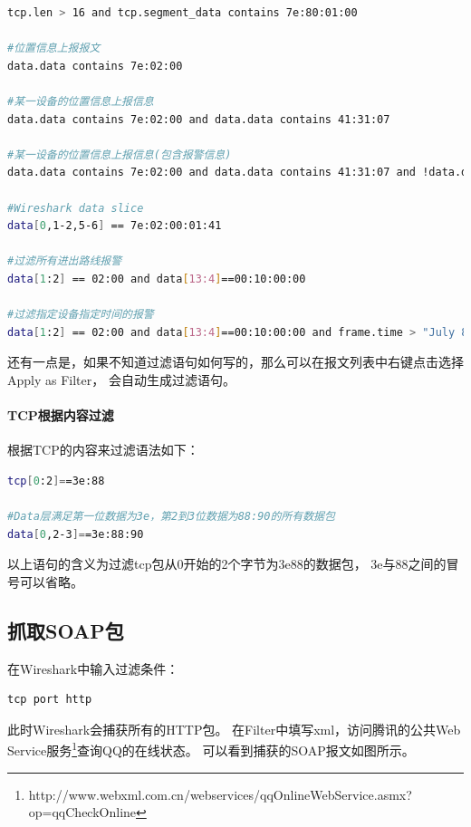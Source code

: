 \documentclass{book}
\begin{document}
\begin{lstlisting}[language=Bash]
tcp.len > 16 and tcp.segment_data contains 7e:80:01:00

#位置信息上报报文
data.data contains 7e:02:00

#某一设备的位置信息上报信息
data.data contains 7e:02:00 and data.data contains 41:31:07

#某一设备的位置信息上报信息(包含报警信息)
data.data contains 7e:02:00 and data.data contains 41:31:07 and !data.data[53,4] == 00:00:00:00

#Wireshark data slice
data[0,1-2,5-6] == 7e:02:00:01:41

#过滤所有进出路线报警
data[1:2] == 02:00 and data[13:4]==00:10:00:00

#过滤指定设备指定时间的报警
data[1:2] == 02:00 and data[13:4]==00:10:00:00 and frame.time > "July 8, 2016 10:00:01.009638000" and frame.time < "July 8, 2016 17:00:01.009638000" and data[8:3] == 07:18:13
\end{lstlisting}

还有一点是，如果不知道过滤语句如何写的，那么可以在报文列表中右键点击选择Apply as Filter，
会自动生成过滤语句。

\paragraph{TCP根据内容过滤}

根据TCP的内容来过滤语法如下：

\begin{lstlisting}[language=Bash]
tcp[0:2]==3e:88

#Data层满足第一位数据为3e，第2到3位数据为88:90的所有数据包
data[0,2-3]==3e:88:90
\end{lstlisting}

以上语句的含义为过滤tcp包从0开始的2个字节为3e88的数据包，
3e与88之间的冒号可以省略。

\subsection{抓取SOAP包}

在Wireshark中输入过滤条件：

\begin{lstlisting}[language=Bash]
tcp port http
\end{lstlisting}

此时Wireshark会捕获所有的HTTP包。
在Filter中填写xml，访问腾讯的公共Web Service服务\footnote{http://www.webxml.com.cn/webservices/qqOnlineWebService.asmx?op=qqCheckOnline}查询QQ的在线状态。
可以看到捕获的SOAP报文如图所示。
\end{document}
